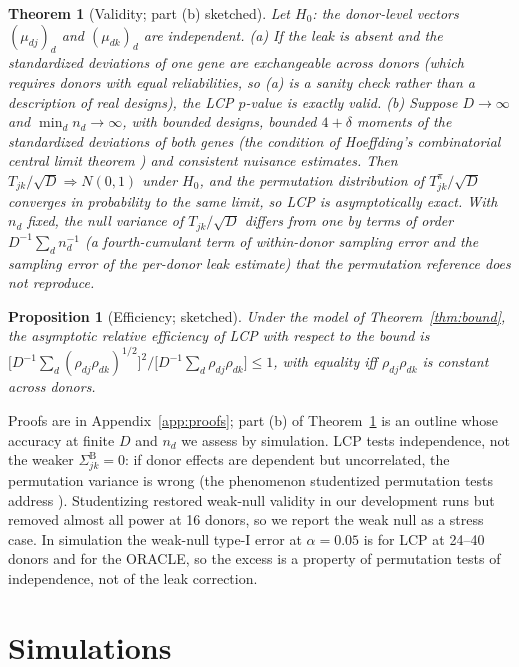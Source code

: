 \documentclass[10pt,letterpaper]{article}
\newtheorem{theorem}{Theorem}
\newtheorem{proposition}{Proposition}
\theoremstyle{definition}
\newcommand{\SB}{\Sigma^{\mathrm{B}}}
\begin{document}
\begin{theorem}[Validity; part (b) sketched]\label{thm:lcp}
Let $H_0$: the donor-level vectors $(\mu_{dj})_d$ and $(\mu_{dk})_d$ are independent. (a) If the leak is absent and the standardized deviations of one gene are exchangeable across donors (which requires donors with equal reliabilities, so (a) is a sanity check rather than a description of real designs), the LCP $p$-value is exactly valid. (b) Suppose $D\to\infty$ and $\min_dn_d\to\infty$, with bounded designs, bounded $4+\delta$ moments of the standardized deviations of both genes (the condition of Hoeffding's combinatorial central limit theorem \citep{Hoeffding1951}) and consistent nuisance estimates. Then $T_{jk}/\sqrt D\Rightarrow N(0,1)$ under $H_0$, and the permutation distribution of $T^\pi_{jk}/\sqrt D$ converges in probability to the same limit, so LCP is asymptotically exact. With $n_d$ fixed, the null variance of $T_{jk}/\sqrt D$ differs from one by terms of order $D^{-1}\sum_dn_d^{-1}$ (a fourth-cumulant term of within-donor sampling error and the sampling error of the per-donor leak estimate) that the permutation reference does not reproduce.
\end{theorem}
\begin{proposition}[Efficiency; sketched]\label{prop:are}
Under the model of Theorem~\ref{thm:bound}, the asymptotic relative efficiency of LCP with respect to the bound is $\big[D^{-1}\sum_d(\rho_{dj}\rho_{dk})^{1/2}\big]^2/\big[D^{-1}\sum_d\rho_{dj}\rho_{dk}\big]\le1$, with equality iff $\rho_{dj}\rho_{dk}$ is constant across donors.
\end{proposition}
Proofs are in Appendix~\ref{app:proofs}; part (b) of Theorem~\ref{thm:lcp} is an outline whose accuracy at finite $D$ and $n_d$ we assess by simulation. LCP tests independence, not the weaker $\SB_{jk}=0$: if donor effects are dependent but uncorrelated, the permutation variance is wrong (the phenomenon studentized permutation tests address \citep{DiCiccioRomano2017}). Studentizing restored weak-null validity in our development runs but removed almost all power at 16 donors, so we report the weak null as a stress case. In simulation the weak-null type-I error at $\alpha=0.05$ is \QQLCP{} for LCP at 24--40 donors and \QQORACLE{} for the ORACLE, so the excess is a property of permutation tests of independence, not of the leak correction.

\section{Simulations}
\end{document}
